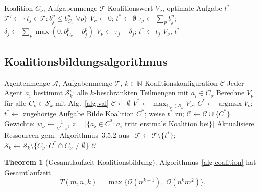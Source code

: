 ﻿\documentclass[a4paper,12pt]{article}
\theoremstyle{definition}
\newtheorem{theorem}[definition]{Theorem}
\DeclareMathOperator{\argmax}{argmax}
\newcommand{\N}{\mathbb{N}}
\newcommand{\calA}{\mathcal{A}}
\newcommand{\calT}{\mathcal{T}}
\newcommand{\calC}{\mathcal{C}}
\newcommand{\calS}{\mathcal{S}}
\begin{document}
\begin{algorithm}[H]
\caption{Berechnung des Koalitionswertes (analog Shehory-Kraus)}
\label{alg:val}
\begin{algorithmic}[1]
  \Require Koalition $C_\nu$, Aufgabenmenge $\calT$
  \Ensure Koalitionswert $V_\nu$, optimale Aufgabe $t^*$
  \State $\calT' \leftarrow \{t_j \in \calT : b_j^p \leq b_{C_\nu}^p\;\forall p\}$
  \State $V_\nu \leftarrow 0$; $t^* \leftarrow \emptyset$
  \For{$t_j \in \calT'$}
    \State $\tau_j \leftarrow \sum_p b_j^p$;
           $\delta_j \leftarrow \sum_p \max(0, b_{C_\nu}^p - b_j^p)$
      \State $V_\nu \leftarrow \tau_j - \delta_j$; $t^* \leftarrow t_j$
    \EndIf
  \EndFor
  \State \Return $V_\nu$, $t^*$
\end{algorithmic}
\end{algorithm}

\subsection{Koalitionsbildungsalgorithmus}

\begin{algorithm}[H]
\caption{Drosophila-MAS Koalitionsbildung}
\label{alg:coalition}
\begin{algorithmic}[1]
  \Require Agentenmenge $\calA$, Aufgabenmenge $\calT$, $k \in \N$
  \Ensure Koalitionskonfiguration $\calC$
  \State Jeder Agent $a_i$ bestimmt $\calS_k^i$:
         alle $k$-beschr\"ankten Teilmengen mit $a_i \in C_\nu$
  \State Berechne $V_\nu$ f\"ur alle $C_\nu \in \calS_k$ mit Alg.~\ref{alg:val}
  \State $\calC \leftarrow \emptyset$
  \While{$\calT \neq \emptyset$ \textbf{und} $\calS_k \neq \emptyset$}
    \State $V^* \leftarrow \max_{C_\nu \in \calS_k} V_\nu$; \;
           $C^* \leftarrow \argmax V_\nu$; \; $t^* \leftarrow$ zugeh\"orige Aufgabe
    \State Bilde Koalition $C^*$; weise $t^*$ zu; $\calC \leftarrow \calC \cup \{C^*\}$
    \State Gewichte: $w_\nu \leftarrow \frac{1}{V^* \cdot z}$,
           $z = |\{a_i \in C^*: a_i$ tritt erstmals Koalition bei$\}|$
    \State Aktualisiere Ressourcen gem.\ Algorithmus~3.5.2 aus~\cite{SK98}
    \State $\calT \leftarrow \calT \setminus \{t^*\}$;\;
           $\calS_k \leftarrow \calS_k \setminus \{C_\nu : C^* \cap C_\nu \neq \emptyset\}$
  \EndWhile
  \State \Return $\calC$
\end{algorithmic}
\end{algorithm}

\begin{theorem}[Gesamtlaufzeit Koalitionsbildung]
\label{thm:runtime_total}
Algorithmus~\ref{alg:coalition} hat Gesamtlaufzeit
\begin{equation}
  T(m, n, k) = \max\!\bigl\{\mathcal{O}(n^{k+1}),\; \mathcal{O}(n^k m^2)\bigr\}.
  \label{eq:runtime_coal}
\end{equation}
\end{theorem}
\end{document}
